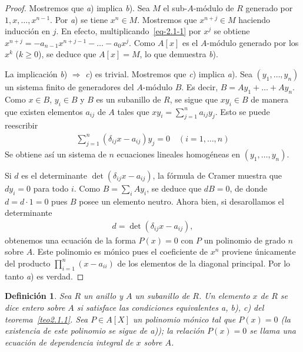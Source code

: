 \documentclass[oneside,bibtotoc,leqno,spanish]{amsbook}
\newcommand{\then}{\ensuremath{\Rightarrow}\xspace}
\numberwithin{equation}{section}
\theoremstyle{defi}
\newtheorem{definition}{Definici\'on}
\theoremstyle{note}
\theoremstyle{rem}
\numberwithin{theorem}{section}
\numberwithin{proposition}{section}
\numberwithin{definition}{section}
\numberwithin{lemma}{section}
\numberwithin{corollary}{section}
\numberwithin{example}{section}
\numberwithin{footnote}{section}%
\begin{document}
\begin{proof}
Mostremos que {\itshape a}) implica {\itshape b}). Sea $M$ el sub-$A$-m\'odulo de $R$ generado por $1, x, \dots, x^{n-1}$.
Por {\itshape a}) se tiene $x^{n}\in M$. Mostremos que $x^{n+j}\in M$ haciendo inducci\'on en $j$. En efecto,
multiplicando~\eqref{eq-2.1-1} por $x^{j}$ se obtiene $x^{n+j}=-a_{n-1}x^{n+j-1}-\dots-a_{0}x^{j}$.
Como $A[x]$ es el $A$-m\'odulo generado por los $x^{k}$ ($k\geq 0$), se deduce que $A[x] = M$, lo que demuestra
{\itshape b}).

La implicaci\'on {\itshape b}) $\then$ {\itshape c}) es trivial. Mostremos que {\itshape c}) implica {\itshape a}).
Sea $(y_{1},\dots,y_{n})$ un sistema finito de generadores del $A$-m\'odulo $B$. Es decir,
$B = Ay_{1}+\dots+Ay_{n}$. Como $x\in B$, $y_{i}\in B$
y $B$ es un subanillo de $R$, se sigue que $xy_{i}\in B$ de manera que existen elementos $a_{ij}$ de $A$
tales que $xy_{i} = \sum_{j=1}^{n}a_{ij}y_{j}$. Esto se puede reescribir
\begin{gather*}
\sum_{j=1}^{n}(\delta_{ij}x-a_{ij})y_{j} = 0\quad(i=1,\dots,n)
\end{gather*}
Se obtiene as\'i un sistema de $n$ ecuaciones lineales homog\'eneas en $(y_{1},\dots,y_{n})$.

Si $d$ es el determinante $\det(\delta_{ij}x-a_{ij})$, la f\'ormula de
Cramer muestra que $dy_{i} = 0$ para todo $i$. Como $B = \sum_{i}Ay_{i}$, se deduce que
$dB = 0$, de donde $d = d\cdot 1 = 0$ pues $B$ posee un elemento neutro. Ahora bien, si desarollamos el
determinante
\begin{gather*}
d = \det(\delta_{ij}x - a_{ij}),
\end{gather*}
obtenemos una ecuaci\'on de la forma $P(x) = 0$ con $P$ un polinomio de grado $n$ sobre $A$. Este polinomio
es m\'onico pues el coeficiente de $x^{n}$ proviene \'unicamente del producto $\prod_{i=1}^{n}(x-a_{ii})$
de los elementos de la diagonal principal. Por lo tanto {\itshape a}) es verdad.
\end{proof}

\begin{definition}\label{def2.1.1}
Sea $R$ un anillo y $A$ un subanillo de $R$. Un elemento $x$ de $R$ se dice entero sobre $A$ si satisface
las condiciones equivalentes a, b), c) del teorema~\ref{teo2.1.1}.
Sea $P\in A[X]$ un polinomio m\'onico tal que
$P(x) = 0$ (la existencia de este polinomio se sigue de a)); la relaci\'on $P(x) = 0$ se llama una
ecuaci\'on de dependencia integral de $x$ sobre $A$.
\end{definition}
\end{document}
